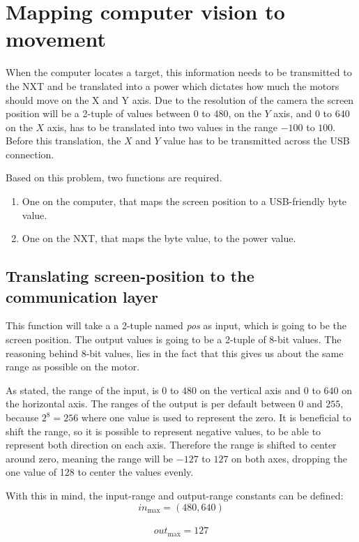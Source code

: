\section{Mapping computer vision to movement}\label{sec:mappingcompvis}
When the computer locates a target, this information needs to be transmitted to the NXT and be translated into a power which dictates how much the motors should move on the X and Y axis.
Due to the resolution of the camera the screen position will be a 2-tuple of values between $0$ to $480$, on the $Y$ axis, and $0$ to $640$ on the $X$ axis, has to be translated into two values in the range $-100$ to $100$.
Before this translation, the $X$ and $Y$ value has to be transmitted across the USB connection.

Based on this problem, two functions are required.
\begin{enumerate}
	\item One on the computer, that maps the screen position to a USB-friendly byte value.
	\item One on the NXT, that maps the byte value, to the power value.
\end{enumerate}


\subsection{Translating screen-position to the communication layer}
This function will take a a 2-tuple named \textit{pos} as input, which is going to be the screen position.
The output values is going to be a 2-tuple of 8-bit values.
The reasoning behind 8-bit values, lies in the fact that this gives us about the same range as possible on the motor.

As stated, the range of the input, is $0$ to $480$ on the vertical axis and $0$ to $640$ on the horizontal axis.
The ranges of the output is per default between $0$ and $255$, because $2^8 = 256 $ where one value is used to represent the zero.
It is beneficial to shift the range, so it is possible to represent negative values, to be able to represent both direction on each axis.
Therefore the range is shifted to center around zero, meaning the range will be $-127$ to $127$ on both axes, dropping the one value of 128 to center the values evenly.

With this in mind, the input-range and output-range constants can be defined:\\
$$in_\text{max} = (480,640)$$\\
$$out_\text{max} = 127$$

